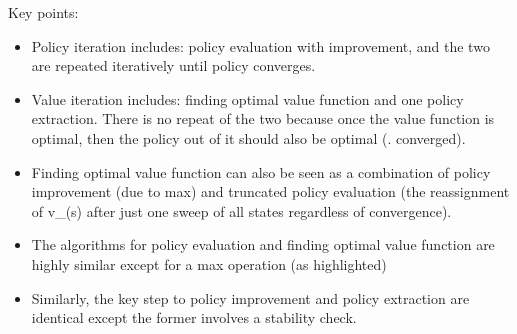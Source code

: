 Key points:
\begin{itemize}
	\item Policy iteration includes: policy evaluation with improvement, and the two are repeated iteratively until policy converges.
	\item Value iteration includes: finding optimal value function and one policy extraction. There is no repeat of the two because once the value function is optimal, then the policy out of it should also be optimal (\ie. converged).
	\item Finding optimal value function can also be seen as a combination of policy improvement (due to max) and truncated policy evaluation (the reassignment of v_(s) after just one sweep of all states regardless of convergence).
	\item The algorithms for policy evaluation and finding optimal value function are highly similar except for a max operation (as highlighted)
	\item Similarly, the key step to policy improvement and policy extraction are identical except the former involves a stability check.
\end{itemize}
